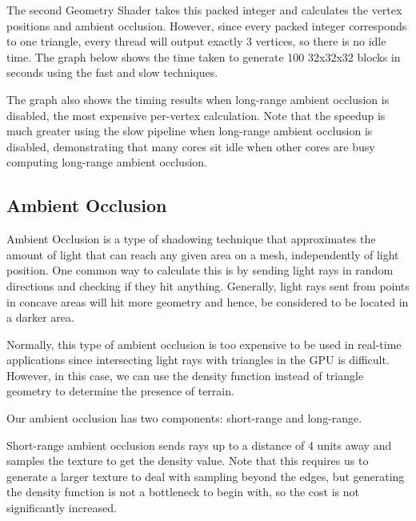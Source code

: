 \documentclass {article}
\begin{document}
The second Geometry Shader takes this packed integer and calculates the vertex positions and ambient occlusion. However, since every packed integer corresponds to one triangle, every thread will output exactly 3 vertices, so there is no idle time. The graph below shows the time taken to generate 100 32x32x32 blocks in seconds using the fast and slow techniques.

\begin{center}
\begin{bchart}[step=2,max=10]
        \smallskip
        \smallskip
        \smallskip
\end{bchart}
\end{center}

The graph also shows the timing results when long-range ambient occlusion is disabled, the most expensive per-vertex calculation. Note that the speedup is much greater using the slow pipeline when long-range ambient occlusion is disabled, demonstrating that many cores sit idle when other cores are busy computing long-range ambient occlusion.

\subsection{Ambient Occlusion}

Ambient Occlusion is a type of shadowing technique that approximates the amount of light that can reach any given area on a mesh, independently of light position. One common way to calculate this is by sending light rays in random directions and checking if they hit anything. Generally, light rays sent from points in concave areas will hit more geometry and hence, be considered to be located in a darker area.

Normally, this type of ambient occlusion is too expensive to be used in real-time applications since intersecting light rays with triangles in the GPU is difficult. However, in this case, we can use the density function instead of triangle geometry to determine the presence of terrain.

Our ambient occlusion has two components: short-range and long-range.

Short-range ambient occlusion sends rays up to a distance of 4 units away and samples the texture to get the density value. Note that this requires us to generate a larger texture to deal with sampling beyond the edges, but generating the density function is not a bottleneck to begin with, so the cost is not significantly increased.
\end{document}
